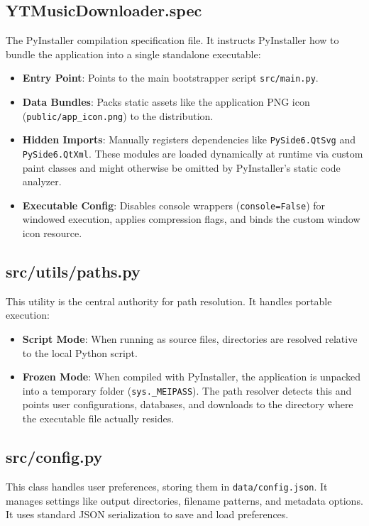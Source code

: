 \documentclass[12pt]{report}
\begin{document}
\subsection{YTMusicDownloader.spec}
The PyInstaller compilation specification file. It instructs PyInstaller how to bundle the application into a single standalone executable:
\begin{itemize}[leftmargin=*]
    \item \textbf{Entry Point}: Points to the main bootstrapper script \texttt{src/main.py}.
    \item \textbf{Data Bundles}: Packs static assets like the application PNG icon (\texttt{public/app\_icon.png}) to the distribution.
    \item \textbf{Hidden Imports}: Manually registers dependencies like \texttt{PySide6.QtSvg} and \texttt{PySide6.QtXml}. These modules are loaded dynamically at runtime via custom paint classes and might otherwise be omitted by PyInstaller's static code analyzer.
    \item \textbf{Executable Config}: Disables console wrappers (\texttt{console=False}) for windowed execution, applies compression flags, and binds the custom window icon resource.
\end{itemize}

\subsection{src/utils/paths.py}
This utility is the central authority for path resolution. It handles portable execution:
\begin{itemize}[leftmargin=*]
    \item \textbf{Script Mode}: When running as source files, directories are resolved relative to the local Python script.
    \item \textbf{Frozen Mode}: When compiled with PyInstaller, the application is unpacked into a temporary folder (\texttt{sys.\_MEIPASS}). The path resolver detects this and points user configurations, databases, and downloads to the directory where the executable file actually resides.
\end{itemize}

\subsection{src/config.py}
This class handles user preferences, storing them in \texttt{data/config.json}. It manages settings like output directories, filename patterns, and metadata options. It uses standard JSON serialization to save and load preferences.
\end{document}
